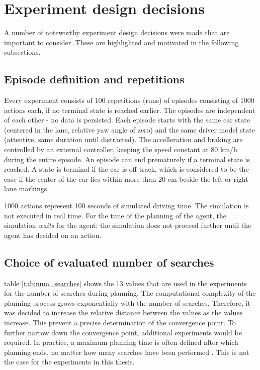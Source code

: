 \section{Experiment design decisions}
\label{sec:design_decisions}
A number of noteworthy experiment design decisions were made that are important to consider. These are highlighted and motivated in the following subsections.

\subsection{Episode definition and repetitions}



Every experiment consists of 100 repetitions (runs) of episodes consisting of 1000 actions each, if no terminal state is reached earlier. The episodes are independent of each other - no data is persisted. Each episode starts with the same car state (centered in the lane, relative yaw angle of zero) and the same driver model state (attentive, same duration until distracted). The accelleration and braking are controlled by an external controller, keeping the speed constant at 80 km/h during the entire episode. An episode can end prematurely if a terminal state is reached. A state is terminal if the car is off track, which is considered to be the case if the center of the car lies within more than 20 cm beside the left or right lane markings.

1000 actions represent 100 seconds of simulated driving time. The simulation is not executed in real time. For the time of the planning of the agent, the simulation \emph{waits} for the agent; the simulation does not proceed further until the agent has decided on an action. 

\subsection{Choice of evaluated number of searches}



table \ref{tab:num_searches} shows the 13 values that are used in the experiments for the number of searches during planning. The computational complexity of the planning process grows exponentially with the number of searches. Therefore, it was decided to increase the relative distance between the values as the values increase. This prevent a precise determination of the convergence point. To further narrow down the convergence point, additional experiments would be required. In practice, a maximum planning time is often defined after which planning ends, no matter how many searches have been performed \parencite{pomcp}. This is not the case for the experiments in this thesis.

